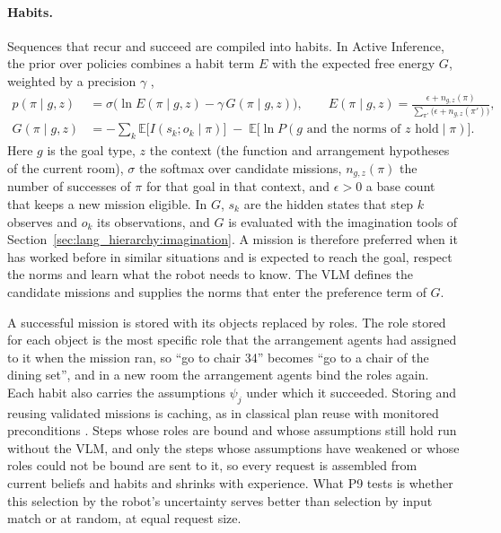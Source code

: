 \paragraph{Habits.}
Sequences that recur and succeed are compiled into habits. In Active Inference, the prior over policies combines a
habit term $E$ with the expected free energy $G$, weighted by a precision $\gamma$
\cite{friston2017process, parr2022active},
\begin{equation}
    \begin{aligned}
    p(\pi \mid g, z) &= \sigma\big(\ln E(\pi \mid g, z) - \gamma\, G(\pi \mid g, z)\big),
    \qquad
    E(\pi \mid g, z) = \frac{\epsilon + n_{g,z}(\pi)}{\sum_{\pi'} \big(\epsilon + n_{g,z}(\pi')\big)},\\
    G(\pi \mid g, z) &= -\sum_k \mathbb{E}\big[I(s_k; o_k \mid \pi)\big]
    \;-\; \mathbb{E}\big[\ln P(g \text{ and the norms of } z \text{ hold} \mid \pi)\big].
    \end{aligned}
    \label{eq:lh_habit}
\end{equation}
Here $g$ is the goal type, $z$ the context (the function and arrangement hypotheses of the current room), $\sigma$
the softmax over candidate missions, $n_{g,z}(\pi)$ the number of successes of $\pi$ for that goal in that context,
and $\epsilon > 0$ a base count that keeps a new mission eligible. In $G$, $s_k$ are the hidden states that step $k$
observes and $o_k$ its observations, and $G$ is evaluated with the imagination tools of
Section~\ref{sec:lang_hierarchy:imagination}. A mission is therefore preferred when it has worked before in similar
situations and is expected to reach the goal, respect the norms and learn what the robot needs to know. The VLM
defines the candidate missions and supplies the norms that enter the preference term of $G$.

A successful mission is stored with its objects replaced by roles. The role stored for each object is the most
specific role that the arrangement agents had assigned to it when the mission ran, so ``go to chair 34'' becomes ``go
to a chair of the dining set'', and in a new room the arrangement agents bind the roles again. Each habit also
carries the assumptions $\psi_j$ under which it succeeded. Storing and reusing validated missions is caching, as in classical plan reuse with monitored preconditions
\cite{fikes1972learning}. Steps whose roles are bound and whose assumptions still hold run without the VLM, and only
the steps whose assumptions have weakened or whose roles could not be bound are sent to it, so every request is
assembled from current beliefs and habits and shrinks with experience. What P9 tests is whether this selection by
the robot's uncertainty serves better than selection by input match or at random, at equal request size.

